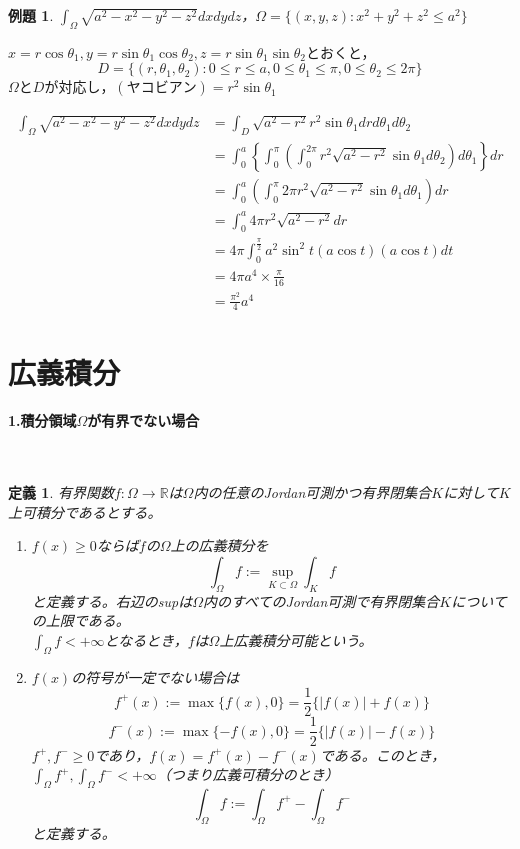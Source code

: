 \documentclass[dvipdfmx,a4j,10pt]{jsarticle}
\makeatletter
\theoremstyle{mystyle1}
\newtheorem{dfn}{定義}[part]
\theoremstyle{mystyle2}
\newtheorem{ex}{例題}
\newtheorem{ans}{解答}
\renewenvironment{ans}[1][解答]{\par
  \pushQED{\qed}%
  \normalfont
  \topsep6\p@\@plus6\p@ \trivlist
  \item[\hskip\labelsep{\bfseries\sffamily #1}]\ignorespaces
}{%
  \popQED\endtrivlist\@endpefalse
}
\makeatother
\begin{document}
\begin{ex}
	$\displaystyle \int_\Omega\sqrt{a^2-x^2-y^2-z^2}dxdydz$，$\Omega=\{(x,y,z):x^2+y^2+z^2\leq a^2\}$
\end{ex}

\begin{ans}
$x=r\cos\theta_1,y=r\sin\theta_1\cos\theta_2,z=r\sin\theta_1\sin\theta_2$とおくと，
\[
	D=\{(r,\theta_1,\theta_2):0\leq r\leq a,0\leq\theta_1\leq\pi,0\leq\theta_2\leq2\pi\}
\]
$\Omega$と$D$が対応し，$(ヤコビアン)=r^2\sin\theta_1$

\[
	\begin{split}
		\int_\Omega\sqrt{a^2-x^2-y^2-z^2}dxdydz
		&=\int_D\sqrt{a^2-r^2}r^2\sin\theta_1drd\theta_1d\theta_2 \\
		&=\int_0^a\left\{\int_0^\pi\left(\int_0^{2\pi}r^2\sqrt{a^2-r^2}\sin\theta_1d\theta_2\right)d\theta_1\right\}dr \\
		&=\int_0^a\left(\int_0^\pi 2\pi r^2\sqrt{a^2-r^2}\sin\theta_1d\theta_1\right)dr \\
		&=\int_0^a 4\pi r^2\sqrt{a^2-r^2}dr \\
		&= 4\pi\int_0^{\frac{\pi}{2}}a^2\sin^2 t(a\cos t)(a\cos t)dt\\
		&=4\pi a^4\times\frac{\pi}{16}\\
		&=\frac{\pi^2}{4}a^4
	\end{split}
\]
\end{ans}


\newpage


\section{広義積分}

\paragraph{1.積分領域$\Omega$が有界でない場合}
\
\begin{framed}
	\begin{dfn}\footnotemark
		有界関数$f:\Omega\to\mathbb{R}$は$\Omega$内の任意のJordan可測\footnotemark かつ有界閉集合$K$に対して$K$上可積分であるとする。
		\begin{enumerate}
			\item $f(x)\geq 0$ならば$f$の$\Omega$上の広義積分を
			\[
				\int_\Omega f := \sup_{K\subset\Omega}\int_K f
			\]
			と定義する。右辺のsupは$\Omega$内のすべてのJordan可測で有界閉集合$K$についての上限である。\\
			$\displaystyle\int_\Omega f<+\infty$となるとき，$f$は$\Omega$上広義積分可能という。
			\item $f(x)$の符号が一定でない場合は
			\[
			f^+(x):=\max\{f(x),0\}=\frac{1}{2}\{|f(x)|+f(x)\}
			\]
			\[
			f^-(x):=\max\{-f(x),0\}=\frac{1}{2}\{|f(x)|-f(x)\}
			\]
			$f^+,f^-\geq 0$であり，$f(x)=f^+(x)-f^-(x)$である。このとき，$\displaystyle\int_\Omega f^+,\int_\Omega f^- <+\infty$（つまり広義可積分のとき）
			\[
			\int_\Omega f := \int_\Omega f^+ - \int_\Omega f^-
			\]
			と定義する。
		\end{enumerate}
	\end{dfn}
\end{framed}
\end{document}
